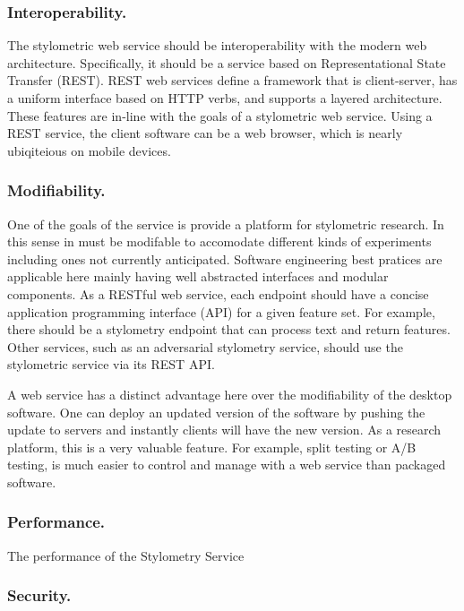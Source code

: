 \documentclass[letterpaper]{article}
\begin{document}
\subsubsection{Interoperability.}

The stylometric web service should be interoperability with the modern
web architecture.  Specifically, it should be a service based on
Representational State Transfer (REST)\cite{Fielding2000}.  REST web
services define a framework that is client-server, has a uniform
interface based on HTTP verbs, and supports a layered architecture.
These features are in-line with the goals of a stylometric web
service.  Using a REST service, the client software can be a web
browser, which is nearly ubiqiteious on mobile devices.


\subsubsection{Modifiability.}

One of the goals of the service is provide a platform for stylometric
research.  In this sense in must be modifable to accomodate different
kinds of experiments including ones not currently anticipated.
Software engineering best pratices are applicable here mainly having
well abstracted interfaces and modular components.  As a RESTful web
service, each endpoint should have a concise application programming
interface (API) for a given feature set.  For example, there should be
a stylometry endpoint that can process text and return features.
Other services, such as an adversarial stylometry service, should use
the stylometric service via its REST API.

A web service has a distinct advantage here over the modifiability of
the desktop software.  One can deploy an updated version of the
software by pushing the update to servers and instantly clients will
have the new version.  As a research platform, this is a very valuable
feature.  For example, split testing or A/B testing, is much easier to
control and manage with a web service than packaged software.

\subsubsection{Performance.}

The performance of the Stylometry Service

\subsubsection{Security.}
\end{document}
